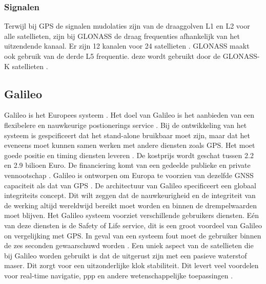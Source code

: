 \subsubsection{Signalen}
Terwijl bij GPS de signalen mudolaties zijn van de draaggolven L1 en L2 voor alle satellieten, zijn bij GLONASS de draag frequenties afhankelijk van het uitzendende kanaal. Er zijn 12 kanalen voor 24 satellieten \cite{LBibGPS3}. GLONASS maakt ook gebruik van de derde L5 frequentie. deze wordt gebruikt door de GLONASS-K satellieten \cite{LBibGNSS9}.  
 
\subsection{Galileo}
\label{LGal}
Galileo is het Europees systeem \cite{LBibGNSS3}\cite{LBibGNSS4}. Het doel van Galileo is het aanbieden van een flexibelere en nauwkeurige postionerings service \cite{LBibGNSS4}. Bij de ontwikkeling van het systeem is gespcificeert dat het stand-alone bruikbaar moet zijn, maar dat het eveneens moet kunnen samen werken met andere diensten zoals GPS. Het moet goede positie en timing diensten leveren \cite{LBibGalileo2}. De kostprijs wordt geschat tussen 2.2 en 2.9 bilioen Euro. De financiering komt van een gedeelde publieke en private vennootschap \cite{LBibGNSS8}. Galileo is ontworpen om Europa te voorzien van dezelfde GNSS capaciteit als dat van GPS \cite{LBibGNSS6}. De architectuur van Galileo specificeert een globaal integriteits concept. Dit wilt zeggen dat de nauwkeurigheid en de integriteit van de werking altijd wereldwijd bereikt moet worden en binnen de drempelwaarden moet blijven.  Het Galileo systeem voorziet verschillende gebruikers diensten. E\'en van deze diensten is de Safety of Life service, dit is een groot voordeel van Galileo  on vergelijking met GPS. In geval van een systeem fout moet de gebruiker binnen de zes seconden gewaarschuwd worden \cite{LBibGalileo}. Een uniek aspect van de satellieten die bij Galileo worden gebruikt is dat de uitgerust zijn met een pasieve waterstof maser. Dit zorgt voor een uitzonderlijke klok stabiliteit. Dit levert veel voordelen voor real-time navigatie, ppp en andere wetenschappelijke toepassingen \cite{LBibGNSS9}.

